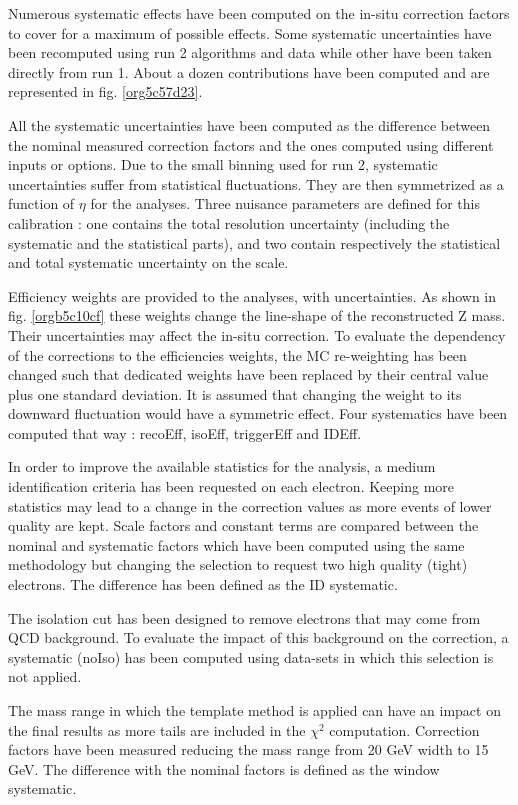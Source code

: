 Numerous systematic effects have been computed on the in-situ correction factors to cover for a maximum of possible effects.
Some systematic uncertainties have been recomputed using run 2 algorithms and data while other have been taken directly from run 1.
About a dozen contributions have been computed and are represented in fig. \ref{org5c57d23}.

All the systematic uncertainties have been computed as the difference between the nominal measured correction factors and the ones computed using different inputs or options.
Due to the small binning used for run 2, systematic uncertainties suffer from statistical fluctuations.
They are then symmetrized as a function of $\eta$ for the analyses.
Three nuisance parameters are defined for this calibration : one contains the total resolution uncertainty (including the systematic and the statistical parts), and two contain respectively the statistical and total systematic uncertainty on the scale.

Efficiency weights are provided to the analyses, with uncertainties.
As shown in fig. \ref{orgb5c10cf} these weights change the line-shape of the reconstructed Z mass.
Their uncertainties may affect the in-situ correction.
To evaluate the dependency of the corrections to the efficiencies weights, the MC re-weighting has been changed such that dedicated weights have been replaced by their central value plus one standard deviation.
It is assumed that changing the weight to its downward fluctuation would have a symmetric effect.
Four systematics have been computed that way : recoEff, isoEff, triggerEff and IDEff.

In order to improve the available statistics for the analysis, a medium identification criteria has been requested on each electron.
Keeping more statistics may lead to a change in the correction values as more events of lower quality are kept.
Scale factors and constant terms are compared between the nominal and systematic factors which have been computed using the same methodology but changing the selection to request two high quality (tight) electrons.
The difference has been defined as the ID systematic.

The isolation cut has been designed to remove electrons that may come from QCD background.
To evaluate the impact of this background on the correction, a systematic (noIso) has been computed using data-sets in which this selection is not applied.

The mass range in which the template method is applied can have an impact on the final results as more tails are included in the $\chi^2$ computation.
Correction factors have been measured reducing the mass range from 20 GeV width to 15 GeV.
The difference with the nominal factors is defined as the window systematic.

